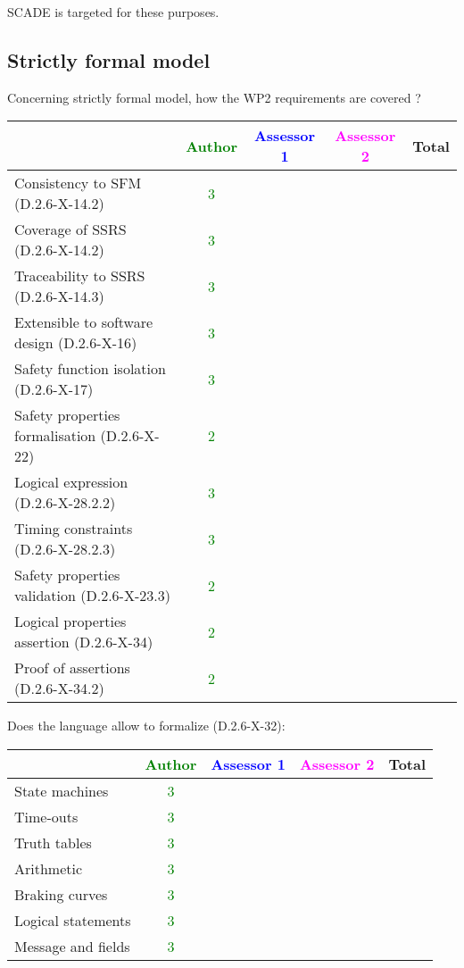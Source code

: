 \begin{author_comment}
SCADE is targeted for these purposes.   
\end{author_comment}


\subsection{Strictly formal model}

Concerning strictly formal model, how the WP2 requirements are covered ?

\begin{tabular}{|l | c | c | c | c|}
\hline
& \textcolor{green}{Author} & \textcolor{blue}{Assessor 1} & \textcolor{magenta}{Assessor 2} & Total \\
\hline 
Consistency to SFM (D.2.6-X-14.2) & \textcolor{green}{3} & & &  \\
\hline
Coverage of SSRS (D.2.6-X-14.2)  &\textcolor{green}{3} & & &  \\
\hline
Traceability to  SSRS (D.2.6-X-14.3)  &\textcolor{green}{3} & & &  \\
\hline
Extensible to software design (D.2.6-X-16)  &\textcolor{green}{3} & & &  \\
\hline
Safety function isolation (D.2.6-X-17)  &  \textcolor{green}{3}& & &  \\
\hline 
Safety properties formalisation (D.2.6-X-22)  &  \textcolor{green}{2}& & &  \\
\hline
Logical expression (D.2.6-X-28.2.2)  &  \textcolor{green}{3}& & &  \\
\hline
Timing constraints (D.2.6-X-28.2.3)  &  \textcolor{green}{3}& & &  \\
\hline
Safety properties validation (D.2.6-X-23.3)  &  \textcolor{green}{2}& & &  \\
\hline
Logical properties assertion (D.2.6-X-34)  &  \textcolor{green}{2}& & &  \\
\hline
Proof of assertions (D.2.6-X-34.2)  &  \textcolor{green}{2} & & &  \\
\hline
\end{tabular}

Does the language allow to  formalize (D.2.6-X-32):

\begin{tabular}{|l | c | c | c | c|}
\hline
& \textcolor{green}{Author} & \textcolor{blue}{Assessor 1} & \textcolor{magenta}{Assessor 2} & Total \\
\hline 
State machines  & \textcolor{green}{3} & & &  \\
\hline
Time-outs  & \textcolor{green}{3} & & &  \\
\hline
Truth tables  & \textcolor{green}{3} & & &  \\
\hline
Arithmetic  & \textcolor{green}{3}& & &  \\
\hline
Braking curves  & \textcolor{green}{3}& & &  \\
\hline
Logical statements & \textcolor{green}{3}& & &  \\
\hline
Message and fields &\textcolor{green}{3} & & &  \\
\hline
\end{tabular}

